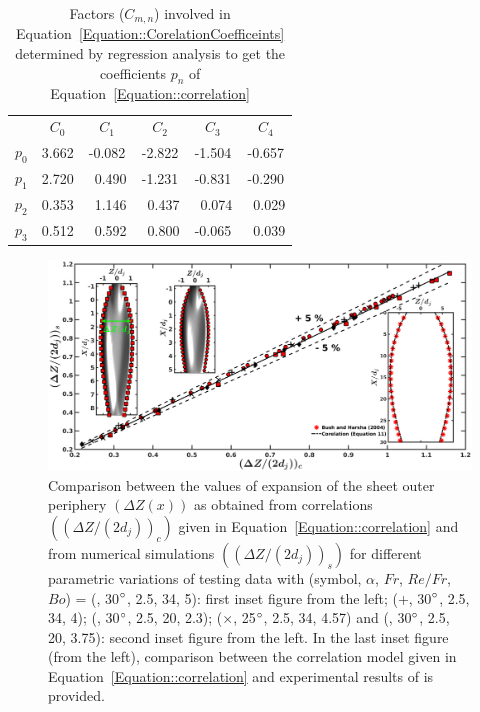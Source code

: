 \documentclass{jfm}
\begin{document}
\clearpage
\begin{table}
	\centering
	\begin{tabular}{@{}cccccc@{}}
		&$C_0$ & $C_1$ & $C_2$ & $C_3$ & $C_4$    \\ 
		$p_0$&3.662&-0.082&-2.822&-1.504&-0.657\\
		$p_1$&2.720&~0.490&-1.231&-0.831&-0.290\\
		$p_2$&0.353&~1.146&~0.437&~0.074&~0.029\\
		$p_3$&0.512&~0.592&~0.800&-0.065&~0.039\\ 
	\end{tabular}
\caption{Factors ($C_{m,n}$) involved in Equation~\ref{Equation::CorelationCoefficeints} determined by regression analysis to get the coefficients $p_n$ of Equation~\ref{Equation::correlation}}
\label{Table::CorrelationPrams}
\end{table}
\begin{figure}
	\centering
	\includegraphics[width=\linewidth]{Figure7}
	\caption{Comparison between the values of expansion of the sheet outer periphery $\left(\Delta Z(x)\right)$ as obtained from correlations $\left((\Delta Z/(2d_j))_c\right)$ given in Equation~\ref{Equation::correlation} and from numerical simulations $\left((\Delta Z/(2d_j))_s\right)$ for different parametric variations of testing data with (symbol, $\alpha$, $Fr$, $Re/Fr$, $Bo$) = (\protect\MarkerSquareRed, 30$\degree$, 2.5, 34, 5): first inset figure from the left; (+, 30$\degree$, 2.5, 34, 4); (\protect \MarkerDiamondBlack, 30$\degree$, 2.5, 20, 2.3); ($\times$, 25$\degree$, 2.5, 34, 4.57) and (\protect \MarkerCircleRed, 30$\degree$, 2.5, 20, 3.75): second inset figure from the left. In the last inset figure (from the left), comparison between the  correlation model given in Equation~\ref{Equation::correlation} and experimental results of \cite{bush2004collision} is provided.}
	\label{Figure::corelatehx}
\end{figure}
\end{document}
